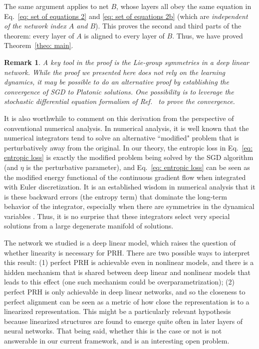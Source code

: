 \documentclass[11pt]{article}
\theoremstyle{plain}
\newtheorem*{remark}{Remark}
\begin{document}
The same argument applies to net $B$, whose layers all obey the same equation in Eq.~\eqref{eq: set of equations 2} and \eqref{eq: set of equations 2b} (which are \textit{independent of the network index $A$ and $B$}). This proves the second and third parts of the theorem: every layer of $A$ is aligned to every layer of $B$. Thus, we have proved Theorem~\ref{theo: main}.


\begin{remark}
    A key tool in the proof is the Lie-group symmetries in a deep linear network. While the proof we presented here does not rely on the learning dynamics, it may be possible to do an alternative proof by establishing the convergence of SGD to Platonic solutions. One possibility is to leverage the stochastic differential equation formalism of Ref.~\cite{ziyin2024parameter} to prove the convergence.
\end{remark}

It is also worthwhile to comment on this derivation from the perspective of conventional numerical analysis. In numerical analysis, it is well known that the numerical integrators tend to solve an alternative ``modified" problem that is perturbatively away from the original. In our theory, the entropic loss in Eq.~\eqref{eq: entropic loss} is exactly the modified problem being solved by the SGD algorithm (and $\eta$ is the perturbative parameter), and Eq.~\eqref{eq: entropic loss} can be seen as the modified energy functional of the continuous gradient flow when integrated with Euler discretization. It is an established wisdom in numerical analysis that it is these backward errors (the entropy term) that dominate the long-term behavior of the integrator, especially when there are symmetries in the dynamical variables \cite{hairer2006geometric}. Thus, it is no surprise that these integrators select very special solutions from a large degenerate manifold of solutions.


The network we studied is a deep linear model, which raises the question of whether linearity is necessary for PRH. There are two possible ways to interpret this result: (1) perfect PRH is achievable even in nonlinear models, and there is a hidden mechanism that is shared between deep linear and nonlinear models that leads to this effect (one such mechanism could be overparametrization); (2) perfect PRH is only achievable in deep linear networks, and so the closeness to perfect alignment can be seen as a metric of how close the representation is to a linearized representation. This might be a particularly relevant hypothesis because linearized structures are found to emerge quite often in later layers of neural networks. That being said, whether this is the case or not is not answerable in our current framework, and is an interesting open problem. 
\end{document}
